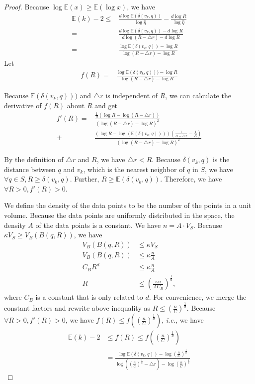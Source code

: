\documentclass{vldb}
\begin{document}
\begin{appendix}
\begin{proof}
Because $\log\mathbb{E}(x) \ge \mathbb{E}(\log x)$, we have
\begin{align*}
\mathbb{E}(k) - 2 \le & \frac{d\log \mathbb{E}(\delta(v_k, q))}{\log\hat{\eta}} - \frac{d\log R}{\log \hat{\eta}}\\
			   = & \frac{d\log \mathbb{E}(\delta(v_k, q)) - d\log R}{d\log (R - \triangle{r}) - d\log R}\\
			   = & \frac{\log \mathbb{E}(\delta(v_k, q)) - \log R}{\log (R - \triangle{r}) - \log R}
\end{align*}
Let
\begin{align*}
			f(R)  = & \frac{\log \mathbb{E}(\delta(v_k, q))) - \log R}{\log (R - \triangle{r}) - \log R}
\end{align*}

Because $\mathbb{E}(\delta(v_k, q)))$ and $\triangle{r}$ is independent of $R$, we can calculate the derivative of $f(R)$ about $R$ and get
\begin{align*}
			f'(R)   = & \frac{\frac{1}{R}(\log R - \log(R- \triangle{r})) }{(\log (R - \triangle{r}) - \log R) ^ 2}\\
				 + & \frac{ (\log R - \log(\mathbb{E}(\delta(v_k, q))))(\frac{1}{R - \triangle{r}} - \frac{1}{R})}{(\log (R - \triangle{r}) - \log R) ^ 2}
\end{align*}

By the definition of $\triangle{r}$ and $R$, we have $\triangle{r} < R$. Because $\delta(v_k, q)$ is the distance between $q$ and $v_k$, which is the nearest neighbor of $q$ in $S$, we have $\forall{q} \in S, R \ge \delta(v_k, q)$. Further, $R \ge \mathbb{E}(\delta(v_k, q))$. Therefore, we have $\forall{R}>0, f'(R) >0$. 

We define the density of the data points to be the number of the points in a unit volume. Because the data points are uniformly distributed in the space, the density $A$ of the data points is a constant. We have $n = A \cdot V_S$. Because $\kappa V_S\ge V_B(B(q, R))$, we have
\begin{align*}
 V_B(B(q, R)) & \le \kappa V_S\\
 V_B(B(q, R)) & \le \kappa \frac{n}{A}\\
 C_BR^d & \le \kappa \frac{n}{A}\\
 R & \le (\frac{\kappa n}{AC_B})^\frac{1}{d},
\end{align*}
where $C_B$ is a constant that is only related to $d$. For convenience, we merge the constant factors and rewrite above inequality as $ R  \le (\frac{n}{C})^\frac{1}{d}$. Because $\forall{R}>0, f'(R) >0$, we have $f(R) \le f((\frac{n}{C})^\frac{1}{d})$, \textit{i.e.}, we have
\begin{align*}
\mathbb{E}(k) - 2 &\le f(R) \le f((\frac{n}{C})^\frac{1}{d})\\
			   &= \frac{\log \mathbb{E}(\delta(v_k, q)) - \log (\frac{n}{C})^\frac{1}{d}}{\log ((\frac{n}{C})^\frac{1}{d} - \triangle{r}) - \log (\frac{n}{C})^\frac{1}{d}}
\end{align*}



\end{proof}
\end{appendix}
\end{document}
